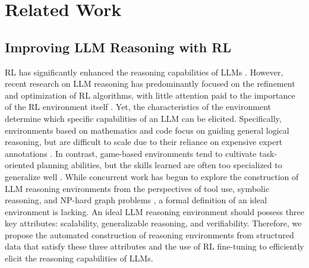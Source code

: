 \documentclass{article} %
\begin{document}








\newpage

\appendix

\section{Related Work}
\label{appdx:a}
\subsection{Improving LLM Reasoning with RL}
RL has significantly enhanced the reasoning capabilities of LLMs \citep{guo2025deepseek, team2025kimi, xie2025logic}. However, recent research on LLM reasoning has predominantly focused on the refinement and optimization of RL algorithms, with little attention paid to the importance of the RL environment itself \citep{shao2024deepseekmath, hu2025reinforce++, yu2025dapo, zheng2025group}. Yet, the characteristics of the environment determine which specific capabilities of an LLM can be elicited. 
Specifically, environments based on mathematics and code focus on guiding general logical reasoning, but are difficult to scale due to their reliance on expensive expert annotations \citep{cobbe2021training, lightman2023let}. In contrast, game-based environments tend to cultivate task-oriented planning abilities, but the skills learned are often too specialized to generalize well \citep{carta2023grounding, tan2024true, wen2024reinforcing}. 
While concurrent work has begun to explore the construction of LLM reasoning environments from the perspectives of tool use, symbolic reasoning, and NP-hard graph problems \citep{fang2025towards, lacombe2025reasoning, wang2025graph}, a formal definition of an ideal environment is lacking. An ideal LLM reasoning environment should possess three key attributes: scalability, generalizable reasoning, and verifiability. 
Therefore, we propose the automated construction of reasoning environments from structured data that satisfy these three attributes and the use of RL fine-tuning to efficiently elicit the reasoning capabilities of LLMs. 
\end{document}
